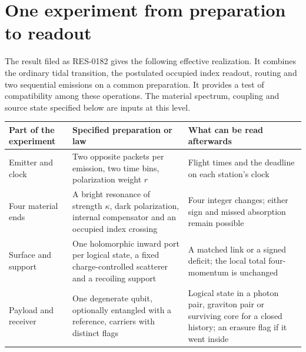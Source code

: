 \section{One experiment from preparation to readout}\label{supp:joint}
The result filed as RES-0182 gives the following effective realization. It combines the ordinary tidal transition, the postulated occupied index readout, routing and two sequential emissions on a common preparation. It provides a test of compatibility among these operations. The material spectrum, coupling and source state specified below are inputs at this level.

\begin{center}\small
\begin{tabularx}{\linewidth}{@{}L{.21\linewidth}XX@{}}\toprule
Part of the experiment & Specified preparation or law & What can be read afterwards\\\midrule
Emitter and clock & Two opposite packets per emission, two time bins, polarization weight \(r\) & Flight times and the deadline on each station's clock\\
Four material ends & A bright resonance of strength \(\kappa\), dark polarization, internal compensator and an occupied index crossing & Four integer changes; either sign and missed absorption remain possible\\
Surface and support & One holomorphic inward port per logical state, a fixed charge-controlled scatterer and a recoiling support & A matched link or a signed deficit; the local total four-momentum is unchanged\\
Payload and receiver & One degenerate qubit, optionally entangled with a reference, carriers with distinct flags & Logical state in a photon pair, graviton pair or surviving core for a closed history; an erasure flag if it went inside\\
\bottomrule\end{tabularx}
\end{center}

